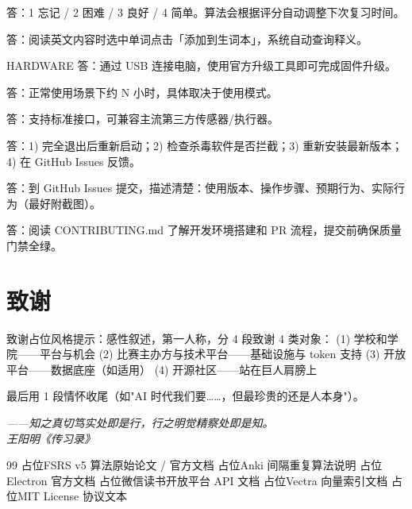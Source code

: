 \documentclass[12pt,a4paper,nomath]{harryopo-report}
\begin{document}
答：1 忘记 / 2 困难 / 3 良好 / 4 简单。算法会根据评分自动调整下次复习时间。

答：阅读英文内容时选中单词点击「添加到生词本」，系统自动查询释义。
\fi

\ifx\projectType HARDWARE
答：通过 USB 连接电脑，使用官方升级工具即可完成固件升级。

答：正常使用场景下约 N 小时，具体取决于使用模式。

答：支持标准接口，可兼容主流第三方传感器/执行器。
\fi

答：1) 完全退出后重新启动；2) 检查杀毒软件是否拦截；3) 重新安装最新版本；4) 在 GitHub Issues 反馈。

答：到 GitHub Issues 提交，描述清楚：使用版本、操作步骤、预期行为、实际行为（最好附截图）。

答：阅读 CONTRIBUTING.md 了解开发环境搭建和 PR 流程，提交前确保质量门禁全绿。
\fi

\chapter{致谢}

{致谢占位}风格提示：感性叙述，第一人称，分 4 段致谢 4 类对象：
(1) 学校和学院——平台与机会
(2) 比赛主办方与技术平台——基础设施与 token 支持
(3) 开放平台——数据底座（如适用）
(4) 开源社区——站在巨人肩膀上

最后用 1 段情怀收尾（如"AI 时代我们要……，但最珍贵的还是人本身"）。

\vspace{1em}
\begin{center}
\itshape ——知之真切笃实处即是行，行之明觉精察处即是知。\\[6pt]
王阳明《传习录》
\end{center}

\ifshowbib
\begin{thebibliography}{99}
 {占位}FSRS v5 算法原始论文 / 官方文档
 {占位}Anki 间隔重复算法说明
 {占位}Electron 官方文档
 {占位}微信读书开放平台 API 文档
 {占位}Vectra 向量索引文档
 {占位}MIT License 协议文本
\end{thebibliography}
\fi

\printfunding
\end{document}
